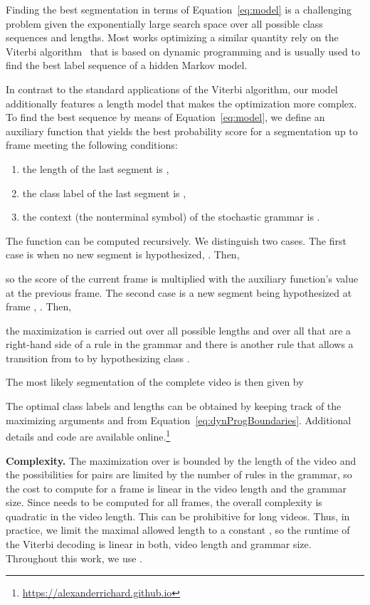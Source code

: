 \documentclass[10pt,twocolumn,letterpaper]{article}
\begin{document}
Finding the best segmentation in terms of Equation~\eqref{eq:model} is a challenging
problem given the exponentially large search space over all possible class sequences
and lengths. Most works optimizing a similar quantity rely on the Viterbi algorithm~\cite{kuehne2017weakly,koller2016deephand,koller2017resign,richard2017weakly}
that is based on dynamic programming and is usually used to find the best label sequence
of a hidden Markov model.

In contrast to the standard applications of the Viterbi algorithm, our model additionally
features a length model that makes the optimization more complex. To find the best
sequence by means of Equation~\eqref{eq:model}, we define an auxiliary function
 that yields the best probability score for a segmentation up to
frame  meeting the following conditions:
\begin{enumerate}
    \setlength{\itemsep}{0pt}
    \setlength{\parskip}{0pt}
    \item the length of the last segment is ,
    \item the class label of the last segment is ,
    \item the context (the nonterminal symbol) of the stochastic grammar is .
\end{enumerate}
The function can be computed recursively. We distinguish two cases. The first case
is when no new segment is hypothesized, \ie . Then,

so the score of the current frame is multiplied with the auxiliary function's value at the previous frame.
The second case is a new segment being hypothesized at frame , \ie . Then,

\ie the maximization is carried out over all possible lengths  and
over all  that are a right-hand side of a rule in the grammar
and there is another rule that allows a transition from  to  by
hypothesizing class .


The most likely segmentation of the complete video is then given by

The optimal class labels  and lengths  can be
obtained by keeping track of the maximizing arguments  and 
from Equation~\eqref{eq:dynProgBoundaries}. Additional details and code are available online.\footnote{\url{https://alexanderrichard.github.io}}

\textbf{Complexity.}
The maximization over  is bounded by the length
 of the video and the possibilities for  pairs are limited
by the number of rules in the grammar, so the cost to compute  for a frame 
is linear in the video length and the grammar size. Since  needs to be computed for
all frames, the overall complexity is quadratic in the video length. This can
be prohibitive for long videos. Thus, in practice, we limit the maximal allowed length to
a constant , so the runtime of the Viterbi decoding is linear in both, video length
and grammar size. Throughout this work, we use .
\end{document}
